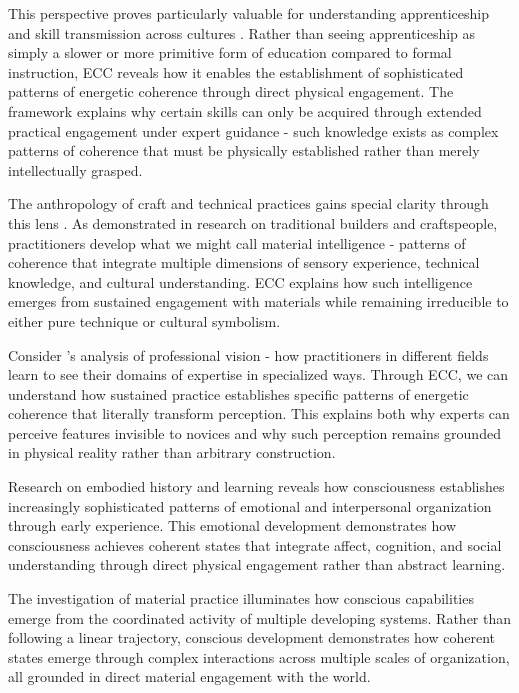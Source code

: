 This perspective proves particularly valuable for understanding apprenticeship and skill transmission across cultures \cite{marchand2010making}. Rather than seeing apprenticeship as simply a slower or more primitive form of education compared to formal instruction, ECC reveals how it enables the establishment of sophisticated patterns of energetic coherence through direct physical engagement. The framework explains why certain skills can only be acquired through extended practical engagement under expert guidance - such knowledge exists as complex patterns of coherence that must be physically established rather than merely intellectually grasped.

The anthropology of craft and technical practices gains special clarity through this lens \cite{bunn1999nomads}. As demonstrated in research on traditional builders and craftspeople, practitioners develop what we might call material intelligence - patterns of coherence that integrate multiple dimensions of sensory experience, technical knowledge, and cultural understanding. ECC explains how such intelligence emerges from sustained engagement with materials while remaining irreducible to either pure technique or cultural symbolism.

Consider \cite{goodwin1994professional}'s analysis of professional vision - how practitioners in different fields learn to see their domains of expertise in specialized ways. Through ECC, we can understand how sustained practice establishes specific patterns of energetic coherence that literally transform perception. This explains both why experts can perceive features invisible to novices and why such perception remains grounded in physical reality rather than arbitrary construction.

Research on embodied history and learning \cite{toren1999mind} reveals how consciousness establishes increasingly sophisticated patterns of emotional and interpersonal organization through early experience. This emotional development demonstrates how consciousness achieves coherent states that integrate affect, cognition, and social understanding through direct physical engagement rather than abstract learning.

The investigation of material practice \cite{warnier2001praxeological} illuminates how conscious capabilities emerge from the coordinated activity of multiple developing systems. Rather than following a linear trajectory, conscious development demonstrates how coherent states emerge through complex interactions across multiple scales of organization, all grounded in direct material engagement with the world.

